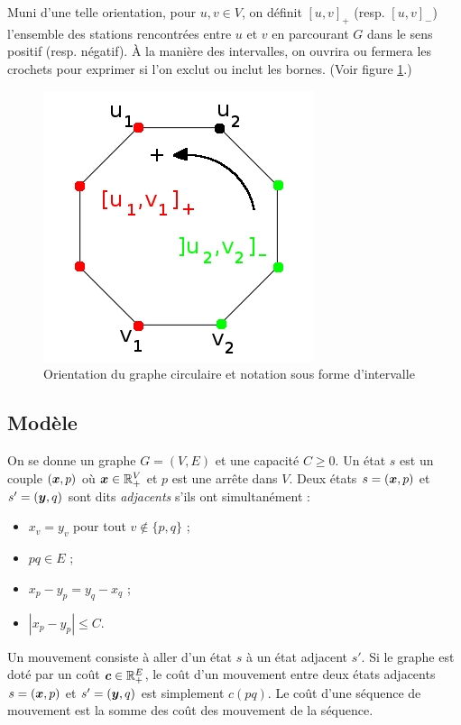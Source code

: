 \documentclass[twoside,11pt,openany,a4paper]{rapport}
\begin{document}
Muni d'une telle orientation, pour $u,v \in V$, on définit $\left[ u,v \right]_+$ (resp. $\left[ u,v \right]_-$) l'ensemble des stations rencontrées entre $u$ et $v$ en parcourant $G$ dans le sens positif (resp. négatif). \`A la manière des intervalles, on ouvrira ou fermera les crochets pour exprimer si l'on exclut ou inclut les bornes. (Voir figure \ref{Notation intervalle graphe}.)
\begin{figure}[ht]
  \centering
  \includegraphics[scale=0.5]{GrapheCirculaire_NotationIntervalle.jpg}
  \caption{Orientation du graphe circulaire et notation sous forme d'intervalle}
  \label{Notation intervalle graphe}
\end{figure}

\subsection{Modèle}

On se donne un graphe $G=(V,E)$ et une capacité $C \ge 0$. Un état $s$ est un couple $(\boldsymbol{x},p)$ où $\boldsymbol{x} \in \mathbb{R}^V_+$ et $p$ est une arrête dans $V$. Deux états $s=(\boldsymbol{x},p)$ et $s'=(\boldsymbol{y},q)$ sont dits \emph{adjacents} s'ils ont simultanément :
\begin{itemize}
\item $x_v=y_v$ pour tout $v \notin \{p,q\}$ ;
\item $pq \in E$ ;
\item $x_p-y_p = y_q-x_q$ ;
\item $\left| x_p-y_p \right| \le C$.
\end{itemize}

Un mouvement consiste à aller d'un état $s$ à un état adjacent $s'$. Si le graphe est doté par un coût $\boldsymbol{c} \in \mathbb{R}^E_+$, le coût d'un mouvement entre deux états adjacents $s=(\boldsymbol{x},p)$ et $s'=(\boldsymbol{y},q)$ est simplement $c(pq)$. Le coût d'une séquence de mouvement est la somme des coût des mouvement de la séquence.
\\
\end{document}
